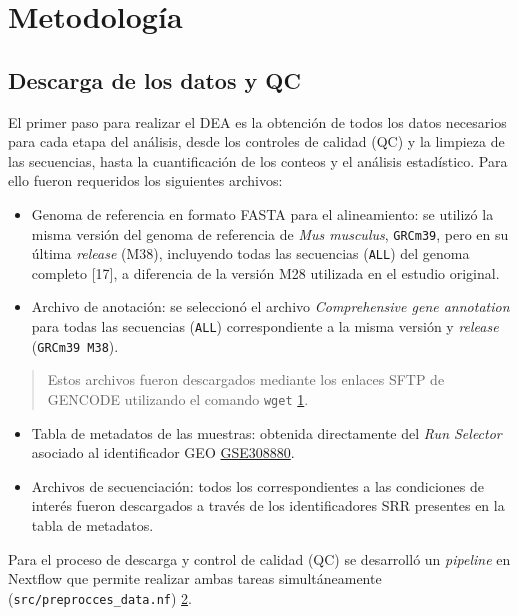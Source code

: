 \documentclass[
  9pt,
]{article}
\providecommand{\tightlist}{%
  \setlength{\itemsep}{0pt}\setlength{\parskip}{0pt}}
\begin{document}
\section{Metodología}\label{metodologuxeda}

\subsection{Descarga de los datos y
QC}\label{descarga-de-los-datos-y-qc}

El primer paso para realizar el DEA es la obtención de todos los datos
necesarios para cada etapa del análisis, desde los controles de calidad
(QC) y la limpieza de las secuencias, hasta la cuantificación de los
conteos y el análisis estadístico. Para ello fueron requeridos los
siguientes archivos:

\begin{itemize}
\tightlist
\item
  Genoma de referencia en formato FASTA para el alineamiento: se utilizó
  la misma versión del genoma de referencia de \emph{Mus musculus},
  \texttt{GRCm39}, pero en su última \emph{release} (M38), incluyendo
  todas las secuencias (\texttt{ALL}) del genoma completo {[}17{]}, a
  diferencia de la versión M28 utilizada en el estudio original.
\item
  Archivo de anotación: se seleccionó el archivo \emph{Comprehensive
  gene annotation} para todas las secuencias (\texttt{ALL})
  correspondiente a la misma versión y \emph{release}
  (\texttt{GRCm39\ M38}).
\end{itemize}

\begin{quote}
Estos archivos fueron descargados mediante los enlaces SFTP de GENCODE
utilizando el comando \texttt{wget} \hyperref[section]{1}.
\end{quote}

\begin{itemize}
\tightlist
\item
  Tabla de metadatos de las muestras: obtenida directamente del
  \emph{Run Selector} asociado al identificador GEO
  \href{https://www.ncbi.nlm.nih.gov/geo/query/acc.cgi?acc=GSE308880}{GSE308880}.
\item
  Archivos de secuenciación: todos los correspondientes a las
  condiciones de interés fueron descargados a través de los
  identificadores SRR presentes en la tabla de metadatos.
\end{itemize}

Para el proceso de descarga y control de calidad (QC) se desarrolló un
\emph{pipeline} en Nextflow que permite realizar ambas tareas
simultáneamente (\texttt{src/preprocces\_data.nf})
\hyperref[section-1]{2}.
\end{document}
